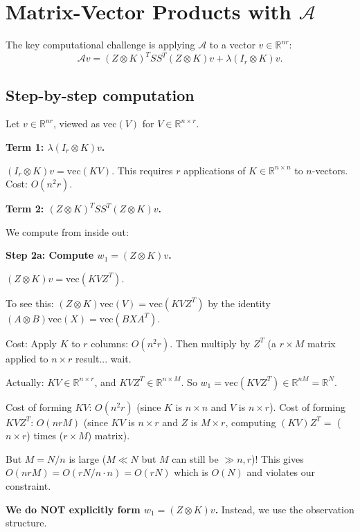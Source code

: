 \documentclass[12pt]{article}
\begin{document}
\section{Matrix-Vector Products with $\mathcal{A}$}

The key computational challenge is applying $\mathcal{A}$ to a vector $v \in \mathbb{R}^{nr}$:
\[
\mathcal{A}v = (Z \otimes K)^T S S^T (Z \otimes K) v + \lambda(I_r \otimes K)v.
\]

\subsection{Step-by-step computation}

Let $v \in \mathbb{R}^{nr}$, viewed as $\mathrm{vec}(V)$ for $V \in \mathbb{R}^{n \times r}$.

\textbf{Term 1: $\lambda(I_r \otimes K)v$.}

$(I_r \otimes K)v = \mathrm{vec}(KV)$. This requires $r$ applications of $K \in \mathbb{R}^{n\times n}$ to $n$-vectors.
Cost: $O(n^2 r)$.

\textbf{Term 2: $(Z \otimes K)^T S S^T (Z \otimes K) v$.}

We compute from inside out:

\textbf{Step 2a: Compute $w_1 = (Z \otimes K)v$.}

$(Z \otimes K)v = \mathrm{vec}(KVZ^T)$.

To see this: $(Z \otimes K)\mathrm{vec}(V) = \mathrm{vec}(KVZ^T)$ by the identity $(A \otimes B)\mathrm{vec}(X) = \mathrm{vec}(BXA^T)$.

Cost: Apply $K$ to $r$ columns: $O(n^2 r)$. Then multiply by $Z^T$ (a $r \times M$ matrix applied to $n \times r$ result... wait.

Actually: $KV \in \mathbb{R}^{n \times r}$, and $KVZ^T \in \mathbb{R}^{n \times M}$. So $w_1 = \mathrm{vec}(KVZ^T) \in \mathbb{R}^{nM} = \mathbb{R}^N$.

Cost of forming $KV$: $O(n^2 r)$ (since $K$ is $n\times n$ and $V$ is $n \times r$).
Cost of forming $KVZ^T$: $O(nrM)$ (since $KV$ is $n\times r$ and $Z$ is $M\times r$, computing $(KV)Z^T = $ ($n\times r$) times ($r\times M$) matrix).

But $M = N/n$ is large ($M \ll N$ but $M$ can still be $\gg n, r$)! This gives $O(nrM) = O(rN/n \cdot n) = O(rN)$ which is $O(N)$ and violates our constraint.

\textbf{We do NOT explicitly form $w_1 = (Z\otimes K)v$.} Instead, we use the observation structure.
\end{document}

